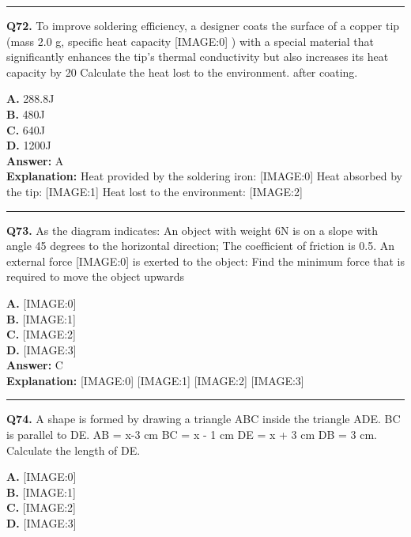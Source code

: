 \documentclass[12pt]{article}
\begin{document}
\hrule
\vspace{1em}


\noindent
\textbf{Q72.} To improve soldering efficiency, a designer coats the surface of a copper tip (mass 2.0 g, specific heat capacity
[IMAGE:0]
) with a special material that significantly enhances the tip's thermal conductivity but also increases its heat capacity by 20%
Calculate the heat lost to the environment. after coating.



\textbf{A.} 288.8J \\
\textbf{B.} 480J \\
\textbf{C.} 640J \\
\textbf{D.} 1200J \\

\textbf{Answer:} A \\
\textbf{Explanation:} Heat provided by the soldering iron:
[IMAGE:0]
Heat absorbed by the tip:
[IMAGE:1]
Heat lost to the environment:
[IMAGE:2]

\hrule
\vspace{1em}


\noindent
\textbf{Q73.} As the diagram indicates: An object with weight 6N is on a slope with angle 45 degrees to the horizontal direction; The coefficient of friction is 0.5. An external force
[IMAGE:0]
is exerted to the object: Find the minimum force that is required to move the object upwards



\textbf{A.} [IMAGE:0] \\
\textbf{B.} [IMAGE:1] \\
\textbf{C.} [IMAGE:2] \\
\textbf{D.} [IMAGE:3] \\

\textbf{Answer:} C \\
\textbf{Explanation:} [IMAGE:0]
[IMAGE:1]
[IMAGE:2]
[IMAGE:3]

\hrule
\vspace{1em}


\noindent
\textbf{Q74.} A shape is formed by drawing a triangle ABC inside the triangle ADE. BC is parallel to DE. AB = x-3 cm BC = x - 1 cm DE = x + 3 cm DB = 3 cm.
Calculate the length of DE.



\textbf{A.} [IMAGE:0] \\
\textbf{B.} [IMAGE:1] \\
\textbf{C.} [IMAGE:2] \\
\textbf{D.} [IMAGE:3] \\
\end{document}
